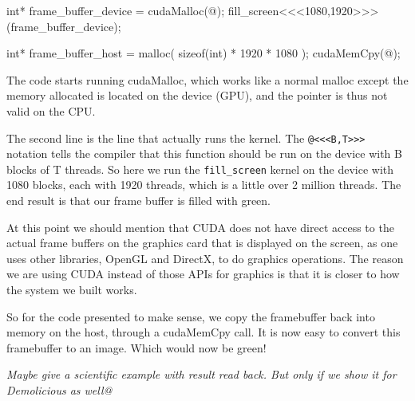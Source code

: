 \documentclass[../main/report.tex]{subfiles}
\begin{document}
\begin{c-code}[caption=Starting the CUDA kernel with one thread per pixel, label=cuda-kernel-launch]
int* frame_buffer_device = cudaMalloc(@);
fill_screen<<<1080,1920>>>(frame_buffer_device);

int* frame_buffer_host = malloc( sizeof(int) * 1920 * 1080 );
cudaMemCpy(@);
\end{c-code}

The code starts running cudaMalloc, which works like a normal malloc except the memory allocated is located on the device (GPU), and the pointer is thus not valid on the CPU.

The second line is the line that actually runs the kernel.
The \verb/@<<<B,T>>>/ notation tells the compiler that this function should be run on the device with B blocks of T threads.
So here we run the \verb/fill_screen/ kernel on the device with 1080 blocks, each with 1920 threads, which is a little over 2 million threads.
The end result is that our frame buffer is filled with green.

At this point we should mention that CUDA does not have direct access to the actual frame buffers on the graphics card that is displayed on the screen, as one uses other libraries, OpenGL and DirectX, to do graphics operations. 
The reason we are using CUDA instead of those APIs for graphics is that it is closer to how the system we built works.

So for the code presented to make sense, we copy the framebuffer back into memory on the host, through a cudaMemCpy call.
It is now easy to convert this framebuffer to an image.
Which would now be green! 







\emph{Maybe give a scientific example with result read back. But only if we show it for Demolicious as well@}
\end{document}
